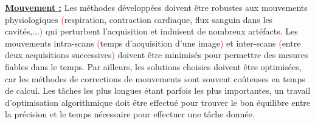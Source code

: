 \underline{\textbf{Mouvement :}} Les méthodes développées doivent être robustes aux mouvements physiologiques \textcolor{red}{(}respiration, contraction cardiaque, flux sanguin dans les cavités,...\textcolor{red}{)} qui perturbent l’acquisition et induisent de nombreux artéfacts. Les mouvements intra-scans \textcolor{red}{(}temps d’acquisition d’une image\textcolor{red}{)} et inter-scans \textcolor{red}{(}entre deux acquisitions successives\textcolor{red}{)} doivent être minimisés pour permettre des mesures fiables dans le temps. Par ailleurs, les solutions choisies doivent être optimisées, car les méthodes de corrections de mouvements sont souvent coûteuses en temps de calcul. Les tâches les plus longues étant parfois les plus importantes, un travail d’optimisation algorithmique doit être effectué pour trouver le bon équilibre entre la précision et le temps nécessaire pour effectuer une tâche donnée.\\